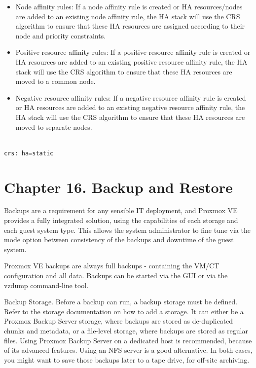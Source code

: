 \begin{itemize}[leftmargin=2cm]

	\item Node affinity rules: If a node affinity rule is created or HA resources/nodes are added to an existing node affinity rule, the HA stack will use the CRS algorithm to ensure that these HA resources are assigned according to their node and priority constraints.

	\item Positive resource affinity rules: If a positive resource affinity rule is created or HA resources are added to an existing positive resource affinity rule, the HA stack will use the CRS algorithm to ensure that these HA resources are moved to a common node.

	\item Negative resource affinity rules: If a negative resource affinity rule is created or HA resources are added to an existing negative resource affinity rule, the HA stack will use the CRS algorithm to ensure that these HA resources are moved to separate nodes.

\end{itemize}

\begin{lstlisting}

crs: ha=static

\end{lstlisting}


\section{Chapter 16. Backup and Restore}

Backups are a requirement for any sensible IT deployment, and Proxmox VE provides a fully integrated solution, using the capabilities of each storage and each guest system type. This allows the system administrator to fine tune via the mode option between consistency of the backups and downtime of the guest system.

Proxmox VE backups are always full backups - containing the VM/CT configuration and all data. Backups can be started via the GUI or via the vzdump command-line tool.

Backup Storage. Before a backup can run, a backup storage must be defined. Refer to the storage documentation on how to add a storage. It can either be a Proxmox Backup Server storage, where backups are stored as de-duplicated chunks and metadata, or a file-level storage, where backups are stored as regular files. Using Proxmox Backup Server on a dedicated host is recommended, because of its advanced features. Using an NFS server is a good alternative. In both cases, you might want to save those backups later to a tape drive, for off-site archiving.

